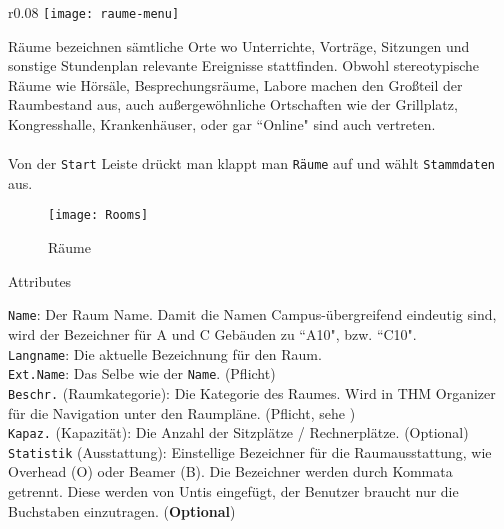 \begin{wrapfigure}{r}{0.08\textwidth}
	\vspace{-80pt}
	\texttt{[image: raume-menu]}
\end{wrapfigure}

\vspace{35pt}

Räume bezeichnen sämtliche Orte wo Unterrichte, Vorträge, Sitzungen und sonstige Stundenplan relevante Ereignisse stattfinden. Obwohl stereotypische Räume wie Hörsäle, Besprechungsräume, Labore machen den Großteil der Raumbestand aus, auch außergewöhnliche Ortschaften wie der Grillplatz, Kongresshalle, Krankenhäuser, oder gar ``Online" sind auch vertreten.\\
\\
Von der \texttt{Start} Leiste drückt man klappt man \texttt{Räume} auf und wählt \texttt{Stammdaten} aus.

\begin{figure}[h]
	\centering
	\texttt{[image: Rooms]}
	\vspace{-5pt}
	\caption{Räume}
	\label{fig:rooms}
\end{figure}

\noindent
{\large Attributes\par}
\vspace{8pt}

\noindent
\texttt{Name}: Der Raum Name. Damit die Namen Campus-übergreifend eindeutig sind, wird der Bezeichner für A und C Gebäuden zu ``A10", bzw. ``C10".\\

\noindent
\texttt{Langname}: Die aktuelle Bezeichnung für den Raum.\\

\noindent
\texttt{Ext.Name}: Das Selbe wie der \texttt{Name}. (Pflicht)\\

\noindent
\texttt{Beschr.} (Raumkategorie): Die Kategorie des Raumes. Wird in THM Organizer für die Navigation unter den Raumpläne. (Pflicht, sehe )\\

\noindent
\texttt{Kapaz.} (Kapazität): Die Anzahl der Sitzplätze / Rechnerplätze. (Optional)\\

\noindent
\texttt{Statistik} (Ausstattung): Einstellige Bezeichner für die Raumausstattung, wie Overhead (O) oder Beamer (B). Die Bezeichner werden durch Kommata getrennt. Diese werden von Untis eingefügt, der Benutzer braucht nur die Buchstaben einzutragen. (\textbf{Optional})\\

